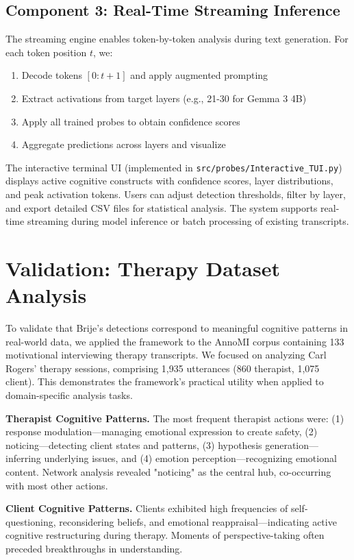 \documentclass[letterpaper]{article}
\begin{document}
\subsection{Component 3: Real-Time Streaming Inference}

The streaming engine enables token-by-token analysis during text generation. For each token position $t$, we:
\begin{enumerate}
\item Decode tokens $[0:t+1]$ and apply augmented prompting
\item Extract activations from target layers (e.g., 21-30 for Gemma 3 4B)
\item Apply all trained probes to obtain confidence scores
\item Aggregate predictions across layers and visualize
\end{enumerate}

The interactive terminal UI (implemented in \texttt{src/probes/Interactive\_TUI.py}) displays active cognitive constructs with confidence scores, layer distributions, and peak activation tokens. Users can adjust detection thresholds, filter by layer, and export detailed CSV files for statistical analysis. The system supports real-time streaming during model inference or batch processing of existing transcripts.

\section{Validation: Therapy Dataset Analysis}

To validate that Brije's detections correspond to meaningful cognitive patterns in real-world data, we applied the framework to the AnnoMI corpus containing 133 motivational interviewing therapy transcripts. We focused on analyzing Carl Rogers' therapy sessions, comprising 1,935 utterances (860 therapist, 1,075 client). This demonstrates the framework's practical utility when applied to domain-specific analysis tasks.

\textbf{Therapist Cognitive Patterns.} The most frequent therapist actions were: (1) response modulation—managing emotional expression to create safety, (2) noticing—detecting client states and patterns, (3) hypothesis generation—inferring underlying issues, and (4) emotion perception—recognizing emotional content. Network analysis revealed "noticing" as the central hub, co-occurring with most other actions.

\textbf{Client Cognitive Patterns.} Clients exhibited high frequencies of self-questioning, reconsidering beliefs, and emotional reappraisal—indicating active cognitive restructuring during therapy. Moments of perspective-taking often preceded breakthroughs in understanding.
\end{document}
